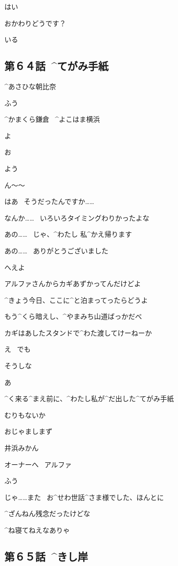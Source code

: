 \Alpha はい

\page
\Alpha おかわりどうです？

\Ojisan いる


\subsection{第６４話\ ^{てがみ}{手紙}}

\page[130]
\Sign ^{あさひな}{朝比奈}

\Alpha ふう

\Sign ^{かまくら}{鎌倉}
\ ^{よこはま}{横浜}

\page
\Alpha よ

\page[135]
\Ojisan お

\page[137]
\Ojisan よう

\Ojisan ん〜〜

\page
\Kokone はあ
\ そうだったんですか……

\Ojisan なんか……
\ いろいろタイミングわりかったよな

\Kokone あの……
\ じゃ、^{わたし }{私}^{かえ}{帰}ります

\Kokone あの……
\ ありがとうございました

\page
\Ojisan へえよ

\Ojisan アルファさんからカギあずかってんだけどよ

\Ojisan ^{きょう}{今日}、ここに^{と}{泊}まってったらどうよ

\Ojisan もう^{くら}{暗}えし、^{やまみち}{山道}ばっかだべ

\Ojisan カギはあしたスタンドで^{わた}{渡}してけーねーか

\Kokone え
\ でも

\Ojisan そうしな

\page
\Kokone あ

\Kokone ^{く}{来}る^{まえ}{前}に、^{わたし}{私}が^{だ}{出}した^{てがみ}{手紙}

\Kokone むりもないか

\page
\Kokone おじゃましまず

\Sign 井浜みかん

\page
\Sign オーナーへ
\ アルファ

\page
\Kokone ふう

\page
\Kokone じゃ……また
\ お^{せわ}{世話}^{さま}{様}でした、ほんとに

\Ojisan ^{ざんねん}{残念}だったけどな

\Ojisan ^{ね}{寝}てねえなありゃ


\subsection{第６５話\ ^{きし}{岸}}

